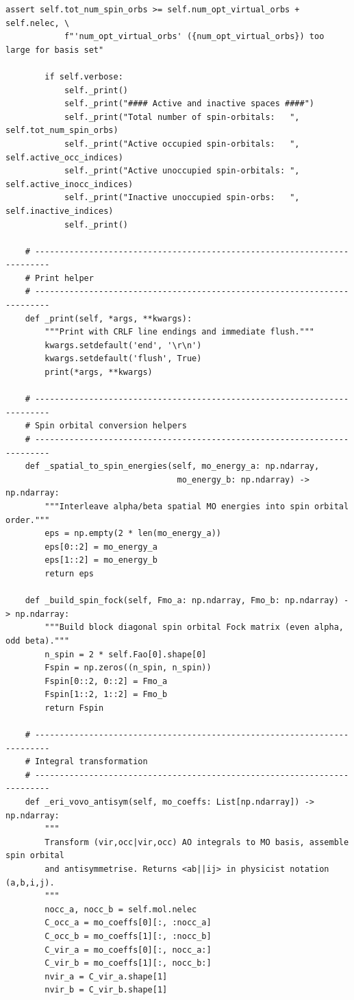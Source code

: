 \begin{lstlisting}[style=python, caption={...}, label=lst:full_code]
        assert self.tot_num_spin_orbs >= self.num_opt_virtual_orbs + self.nelec, \
            f"'num_opt_virtual_orbs' ({num_opt_virtual_orbs}) too large for basis set"

        if self.verbose:
            self._print()
            self._print("#### Active and inactive spaces ####")
            self._print("Total number of spin-orbitals:   ", self.tot_num_spin_orbs)
            self._print("Active occupied spin-orbitals:   ", self.active_occ_indices)
            self._print("Active unoccupied spin-orbitals: ", self.active_inocc_indices)
            self._print("Inactive unoccupied spin-orbs:   ", self.inactive_indices)
            self._print()

    # -------------------------------------------------------------------------
    # Print helper
    # -------------------------------------------------------------------------
    def _print(self, *args, **kwargs):
        """Print with CRLF line endings and immediate flush."""
        kwargs.setdefault('end', '\r\n')
        kwargs.setdefault('flush', True)
        print(*args, **kwargs)

    # -------------------------------------------------------------------------
    # Spin orbital conversion helpers
    # -------------------------------------------------------------------------
    def _spatial_to_spin_energies(self, mo_energy_a: np.ndarray,
                                   mo_energy_b: np.ndarray) -> np.ndarray:
        """Interleave alpha/beta spatial MO energies into spin orbital order."""
        eps = np.empty(2 * len(mo_energy_a))
        eps[0::2] = mo_energy_a
        eps[1::2] = mo_energy_b
        return eps

    def _build_spin_fock(self, Fmo_a: np.ndarray, Fmo_b: np.ndarray) -> np.ndarray:
        """Build block diagonal spin orbital Fock matrix (even alpha, odd beta)."""
        n_spin = 2 * self.Fao[0].shape[0]
        Fspin = np.zeros((n_spin, n_spin))
        Fspin[0::2, 0::2] = Fmo_a
        Fspin[1::2, 1::2] = Fmo_b
        return Fspin

    # -------------------------------------------------------------------------
    # Integral transformation
    # -------------------------------------------------------------------------
    def _eri_vovo_antisym(self, mo_coeffs: List[np.ndarray]) -> np.ndarray:
        """
        Transform (vir,occ|vir,occ) AO integrals to MO basis, assemble spin orbital
        and antisymmetrise. Returns <ab||ij> in physicist notation (a,b,i,j).
        """
        nocc_a, nocc_b = self.mol.nelec
        C_occ_a = mo_coeffs[0][:, :nocc_a]
        C_occ_b = mo_coeffs[1][:, :nocc_b]
        C_vir_a = mo_coeffs[0][:, nocc_a:]
        C_vir_b = mo_coeffs[1][:, nocc_b:]
        nvir_a = C_vir_a.shape[1]
        nvir_b = C_vir_b.shape[1]


\end{lstlisting}
